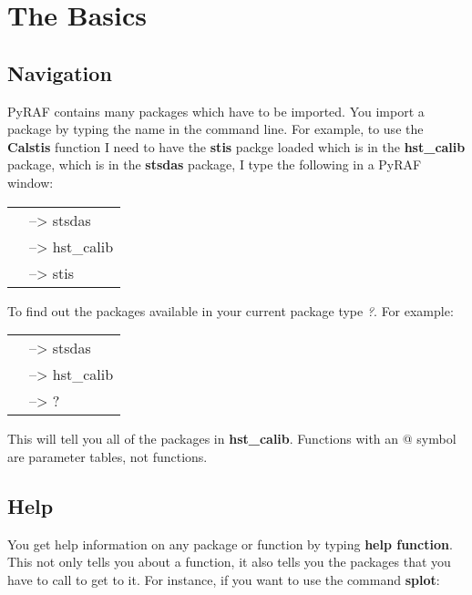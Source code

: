 \section{The Basics}
\subsection{Navigation}
PyRAF contains many packages which have to be imported. You import a package by typing the name in the command line. For example, to use the {\bf Calstis} function I need to have the {\bf stis} packge loaded which is in the {\bf hst\_calib} package, which is in the {\bf stsdas} package,  I type the following in a PyRAF window:

\begin{minipage}{4in}
\setlength{\oddsidemargin}{0.25 in}
\setlength{\evensidemargin}{0.25 in}
\begin{tabular}{ll}
& {\color{RoyalBlue}--> stsdas}\\
& {\color{RoyalBlue}--> hst\_calib}\\
&{\color{RoyalBlue}--> stis}\\
\end{tabular}
\end{minipage}

To find out the packages available in your current package type \emph{?}. For example:

\begin{minipage}{4in}
\setlength{\oddsidemargin}{0.25 in}
\setlength{\evensidemargin}{0.25 in}
\begin{tabular}{ll}
& {\color{RoyalBlue}--> stsdas}\\
& {\color{RoyalBlue}--> hst\_calib}\\
& {\color{RoyalBlue}--> ?}\\
\end{tabular}
\end{minipage}

This will tell you all of the packages in {\bf hst\_calib}. Functions with an @ symbol are parameter tables, not functions.

\subsection{Help}
You get help information on any package or function by typing {\bf help function}. This not only tells you about a function, it also tells you the packages that you have to call to get to it. For instance, if you want to use the command {\bf splot}:

